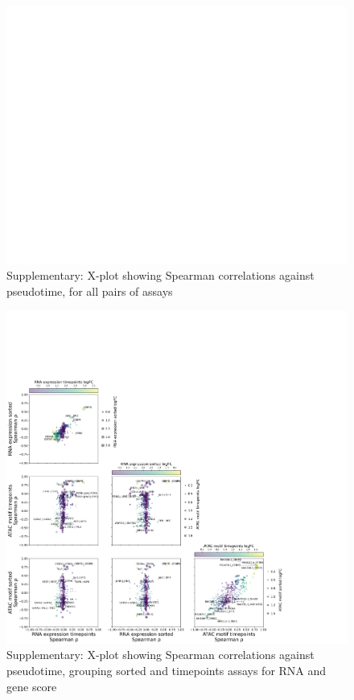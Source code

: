 \documentclass[a4paper]{article}
\begin{document}
\begin{figure}[!htb]
  \centering
  \includegraphics[width=\textwidth]{../figures/hematopoiesis/Monocyte_40_15_smooth_none_detailed_X_plot.png}
  \caption{Supplementary: X-plot showing Spearman correlations against pseudotime, for all pairs of assays}
\end{figure}

\begin{figure}[!htb]
  \centering
  \includegraphics[width=\textwidth]{../figures/hematopoiesis/Monocyte_40_15_smooth_none_semi_detailed_X_plot.png}
  \caption{Supplementary: X-plot showing Spearman correlations against pseudotime, grouping sorted and timepoints assays for RNA and gene score}
\end{figure}
\end{document}
